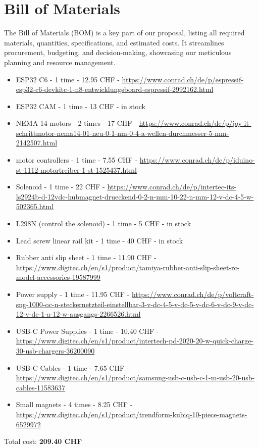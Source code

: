\section{Bill of Materials}

The Bill of Materials (BOM) is a key part of our proposal, listing all required materials, quantities, specifications, and estimated costs.
It streamlines procurement, budgeting, and decision-making, showcasing our meticulous planning and resource management.

\begin{itemize}
    \item ESP32 C6 - 1 time - 12.95 CHF - \url{https://www.conrad.ch/de/p/espressif-esp32-c6-devkitc-1-n8-entwicklungsboard-espressif-2992162.html}
    \item ESP32 CAM - 1 time - 13 CHF - in stock
    \item NEMA 14 motors - 2 times - 17 CHF - \url{https://www.conrad.ch/de/p/joy-it-schrittmotor-nema14-01-neu-0-1-nm-0-4-a-wellen-durchmesser-5-mm-2142507.html}
    \item motor controllers - 1 time - 7.55 CHF - \url{https://www.conrad.ch/de/p/iduino-st-1112-motortreiber-1-st-1525437.html}
    \item Solenoid - 1 time - 22 CHF - \url{https://www.conrad.ch/de/p/intertec-its-ls2924b-d-12vdc-hubmagnet-drueckend-0-2-n-mm-10-22-n-mm-12-v-dc-4-5-w-502365.html}
    \item L298N (control the solenoid) - 1 time - 5 CHF - in stock
    \item Lead screw linear rail kit - 1 time - 40 CHF - in stock
    \item Rubber anti slip sheet - 1 time - 11.90 CHF - \url{https://www.digitec.ch/en/s1/product/tamiya-rubber-anti-slip-sheet-rc-model-accessories-19587999}
    \item Power supply - 1 time - 11.95 CHF - \url{https://www.conrad.ch/de/p/voltcraft-sng-1000-oc-n-steckernetzteil-einstellbar-3-v-dc-4-5-v-dc-5-v-dc-6-v-dc-9-v-dc-12-v-dc-1-a-12-w-ausgangs-2266526.html}
    \item USB-C Power Supplies - 1 time - 10.40 CHF - \url{https://www.digitec.ch/en/s1/product/intertech-pd-2020-20-w-quick-charge-30-usb-chargers-36200090}
    \item USB-C Cables - 1 time - 7.65 CHF - \url{https://www.digitec.ch/en/s1/product/samsung-usb-c-usb-c-1-m-usb-20-usb-cables-11583637}
    \item Small magnets - 4 times - 8.25 CHF - \url{https://www.digitec.ch/en/s1/product/trendform-kubiq-10-piece-magnets-6529972}
\end{itemize}

Total cost: \textbf{209.40 CHF}
